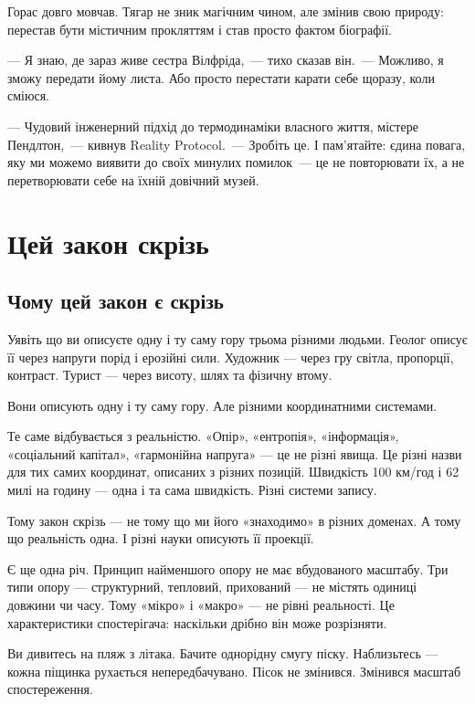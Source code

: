 \documentclass[12pt, a4paper, openany]{book}
\begin{document}
\begin{realitybox}
\medskip
Горас довго мовчав. Тягар не зник магічним чином, але змінив свою природу: перестав бути містичним прокляттям і став просто фактом біографії.

--- Я знаю, де зараз живе сестра Вілфріда,~--- тихо сказав він.~--- Можливо, я зможу передати йому листа. Або просто перестати карати себе щоразу, коли сміюся.

--- Чудовий інженерний підхід до термодинаміки власного життя, містере Пендлтон,~--- кивнув Reality Protocol.~--- Зробіть це. І пам'ятайте: єдина повага, яку ми можемо виявити до своїх минулих помилок~--- це не повторювати їх, а не перетворювати себе на їхній довічний музей.
\end{realitybox}

\part{Цей закон скрізь}

\chapter{Чому цей закон є скрізь}

Уявіть що ви описуєте одну і ту саму гору трьома різними людьми. Геолог описує її через напруги порід і ерозійні сили. Художник --- через гру світла, пропорції, контраст. Турист --- через висоту, шлях та фізичну втому.

Вони описують одну і ту саму гору. Але різними координатними системами.

Те саме відбувається з реальністю. «Опір», «ентропія», «інформація», «соціальний капітал», «гармонійна напруга» --- це не різні явища. Це різні назви для тих самих координат, описаних з різних позицій. Швидкість 100 км/год і 62 милі на годину --- одна і та сама швидкість. Різні системи запису.

Тому закон скрізь --- не тому що ми його «знаходимо» в різних доменах. А тому що реальність одна. І різні науки описують її проекції.

Є ще одна річ. Принцип найменшого опору не має вбудованого масштабу. Три типи опору --- структурний, тепловий, прихований --- не містять одиниці довжини чи часу. Тому «мікро» і «макро» --- не рівні реальності. Це характеристики спостерігача: наскільки дрібно він може розрізняти.

Ви дивитесь на пляж з літака. Бачите однорідну смугу піску. Наблизьтесь --- кожна піщинка рухається непередбачувано. Пісок не змінився. Змінився масштаб спостереження.
\end{document}
